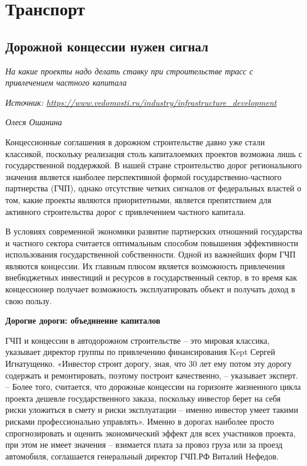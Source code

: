 \chapter{Транспорт}

\section{Дорожной концессии нужен сигнал}

\textit{На какие проекты надо делать ставку при строительстве трасс с привлечением частного капитала}

\textit{Источник: \url{https://www.vedomosti.ru/industry/infrastructure_development}}

\textit{Олеся Ошанина}

Концессионные соглашения в дорожном строительстве давно уже стали классикой, поскольку реализация столь капиталоемких проектов возможна лишь с государственной поддержкой. В нашей стране строительство дорог регионального значения является наиболее перспективной формой государственно-частного партнерства (ГЧП), однако отсутствие четких сигналов от федеральных властей о том, какие проекты являются приоритетными, является препятствием для активного строительства дорог с привлечением частного капитала.

В условиях современной экономики развитие партнерских отношений государства и частного сектора считается оптимальным способом повышения эффективности использования государственной собственности. Одной из важнейших форм ГЧП являются концессии. Их главным плюсом является возможность привлечения внебюджетных инвестиций и ресурсов в государственный сектор, в то время как концессионер получает возможность эксплуатировать объект и получать доход в свою пользу.

\textbf{Дорогие дороги: объединение капиталов}

ГЧП и концессии в автодорожном строительстве – это мировая классика, указывает директор группы по привлечению финансирования Kept Сергей Игнатущенко. «Инвестор строит дорогу, зная, что 30 лет ему потом эту дорогу содержать и ремонтировать, поэтому построит качественно, – указывает эксперт. – Более того, считается, что дорожные концессии на горизонте жизненного цикла проекта дешевле государственного заказа, поскольку инвестор берет на себя риски уложиться в смету и риски эксплуатации – именно инвестор умеет такими рисками профессионально управлять». Именно в дорогах наиболее просто спрогнозировать и оценить экономический эффект для всех участников проекта, при этом не имеет значения – взимается плата за провоз груза или за проезд автомобиля, соглашается генеральный директор ГЧП.РФ Виталий Нефедов.

